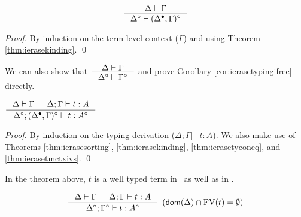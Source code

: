\begin{theorem}
\label{thm:ierasetmctxivs}
\[ \inference{\Delta |- \Gamma}{\Delta^\circ |- (\Delta^\bullet,\Gamma)^\circ}
\]
\end{theorem}
\begin{proof}
        By induction on the term-level context ($\Gamma$)
        and using Theorem \ref{thm:ierasekinding}.
        \qed
\end{proof}
\begin{remark}
We can also show that
$\inference{\Delta |- \Gamma}{\Delta^\circ |- \Gamma^\circ}$
and prove Corollary \ref{cor:ierasetypingifree} directly.
\end{remark}

\begin{theorem}
\label{thm:ierasetypingall}
$ \inference{\Delta |- \Gamma & \Delta;\Gamma |- t : A}
                {\Delta^\circ;(\Delta^\bullet,\Gamma)^\circ |- t : A^\circ}
$
\end{theorem}
\begin{proof}
        By induction on the typing derivation ($\Delta;\Gamma |- t : A$).
        We also make use of Theorems
        \ref{thm:ierasesorting},
        \ref{thm:ierasekinding},
        \ref{thm:ierasetyconeq}, and
        \ref{thm:ierasetmctxivs}.
        \qed
\end{proof}
\begin{remark}
        In the theorem above, $t$ is a well typed term
        in \Fw\ as well as in \Fi.
\end{remark}

\begin{corollary}
\label{cor:ierasetypingifree}
\[ \inference{ \Delta |- \Gamma & \Delta;\Gamma |- t : A}
                {\Delta^\circ;\Gamma^\circ |- t : A^\circ}
                {\enspace(\dom(\Delta)\cap\FV(t) = \emptyset)}
\]
\end{corollary}

